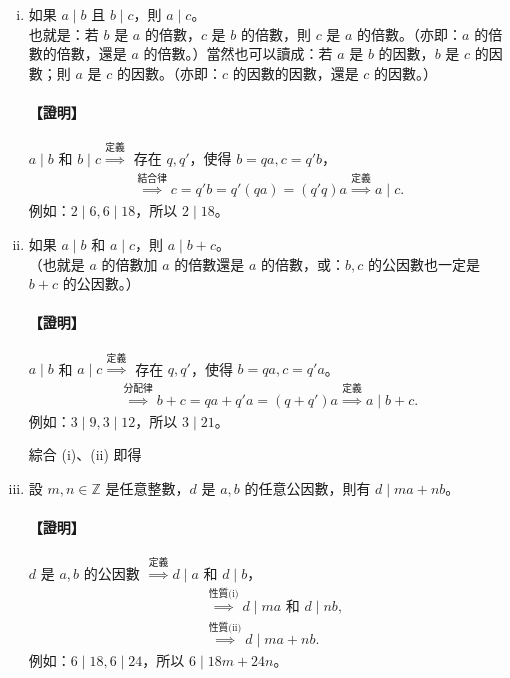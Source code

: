 \begin{enumerate}[(i)]
  \item 如果 $a \mid b$ 且 $b \mid c$，則 $a \mid c$。\\
  也就是：若 $b$ 是 $a$ 的倍數，$c$ 是 $b$ 的倍數，則 $c$ 是 $a$ 的倍數。（亦即：$a$ 的倍數的倍數，還是 $a$ 的倍數。）當然也可以讀成：若 $a$ 是 $b$ 的因數，$b$ 是 $c$ 的因數；則 $a$ 是 $c$ 的因數。（亦即：$c$ 的因數的因數，還是 $c$ 的因數。）
  
  \paragraph{【證明】}
  $a \mid b$ 和 $b \mid c \overset{\text{定義}}{\implies}$ 存在 $q, q'$，使得 $b=qa, c=q'b$，
  \begin{align*}
    \overset{\text{結合律}}{\implies} c = q'b = q'(qa) = (q'q)a \overset{\text{定義}}{\implies} a \mid c.
  \end{align*}
  例如：$2 \mid 6, 6 \mid 18$，所以 $2 \mid 18$。

  \item 如果 $a \mid b$ 和 $a \mid c$，則 $a \mid b+c$。\\
  （也就是 $a$ 的倍數加 $a$ 的倍數還是 $a$ 的倍數，或：$b, c$ 的公因數也一定是 $b+c$ 的公因數。）

  \paragraph{【證明】}
  $a \mid b$ 和 $a \mid c \overset{\text{定義}}{\implies}$ 存在 $q, q'$，使得 $b=qa, c=q'a$。
  \begin{align*}
    \overset{\text{分配律}}{\implies} b+c = qa+q'a = (q+q')a \overset{\text{定義}}{\implies} a \mid b+c.
  \end{align*}
  例如：$3 \mid 9, 3 \mid 12$，所以 $3 \mid 21$。

  綜合 (i)、(ii) 即得

  \item 設 $m, n \in \mathbb{Z}$ 是任意整數，$d$ 是 $a, b$ 的任意公因數，則有 $d \mid ma+nb$。

  \paragraph{【證明】}
  $d$ 是 $a, b$ 的公因數 $\overset{\text{定義}}{\implies} d \mid a$ 和 $d \mid b$，
  \begin{align*}
    &\overset{\text{性質(i)}}{\implies} d \mid ma \text{ 和 } d \mid nb, \\
    &\overset{\text{性質(ii)}}{\implies} d \mid ma+nb.
  \end{align*}
  例如：$6 \mid 18, 6 \mid 24$，所以 $6 \mid 18m+24n$。
\end{enumerate}

